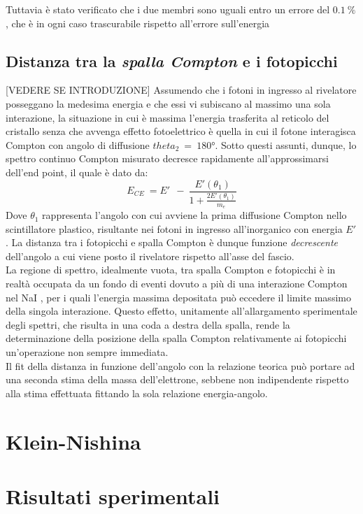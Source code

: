 \documentclass[5pt]{article}
\begin{document}
Tuttavia è stato verificato che i due membri sono uguali entro un errore del $0.1 \ \%$, che è in ogni caso trascurabile rispetto all'errore sull'energia

\subsection{Distanza tra la \textit{spalla Compton} e i fotopicchi}
[VEDERE SE INTRODUZIONE] Assumendo che i fotoni in ingresso al rivelatore posseggano la medesima energia e che essi vi subiscano al massimo una sola interazione, la situazione in cui è massima l'energia trasferita al reticolo del cristallo senza che avvenga effetto fotoelettrico è quella in cui il fotone interagisca Compton con angolo di diffusione $theta_2 \ = \ 180°$. Sotto questi assunti, dunque, lo spettro continuo Compton misurato decresce rapidamente all'approssimarsi dell'end point, il quale è dato da:
\begin{equation}
E_{CE} \ = E' \ \ - \ \frac{E'(\theta_1)}{1+\frac{2E'(\theta_1)}{m_e}}     \nonumber
\end{equation}
Dove $\theta_1$ rappresenta l'angolo con cui avviene la prima diffusione Compton nello scintillatore plastico, risultante nei fotoni in ingresso all'inorganico con energia $E'$.
La distanza tra i fotopicchi e spalla Compton è dunque funzione \textit{decrescente} dell'angolo a cui viene posto il rivelatore rispetto all'asse del fascio.\\
La regione di spettro, idealmente vuota, tra spalla Compton e fotopicchi è in realtà occupata da un fondo di eventi dovuto a più di una interazione Compton nel NaI , per i quali l'energia massima depositata può eccedere il limite massimo della singola interazione. 
Questo effetto, unitamente all'allargamento sperimentale degli spettri, che risulta in una coda a destra della spalla, rende la determinazione della posizione della spalla Compton relativamente ai fotopicchi un'operazione non sempre immediata. \\
Il fit della distanza in funzione dell'angolo con la relazione teorica può portare ad una seconda stima della massa dell'elettrone, sebbene non indipendente rispetto alla stima effettuata fittando la sola relazione energia-angolo.


\section{Klein-Nishina}

\section{Risultati sperimentali}
\end{document}

